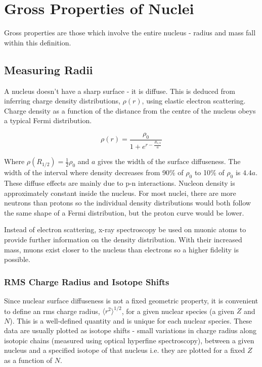 \section{Gross Properties of Nuclei}
Gross properties are those which involve the entire nucleus - radius and mass fall within this definition. 

\subsection{Measuring Radii}
A nucleus doesn't have a sharp surface - it is diffuse. This is deduced from inferring charge density distributions, \(\rho(r)\), using elastic electron scattering. Charge density as a function of the distance from the centre of the nucleus obeys a typical Fermi distribution.

\[\rho (r) = \frac{\rho_0}{1+e^{r-\frac{R_{1/2}}{a}}}\]

Where \(\rho (R_{1/2})=\frac{1}{2}\rho_0\) and \(a\) gives the width of the surface diffuseness. The width of the interval where density decreases from 90\% of \(\rho_0\) to 10\% of \(\rho_0\) is \(4.4a\). These diffuse effects are mainly due to p-n interactions. Nucleon density is approximately constant inside the nucleus. For most nuclei, there are more neutrons than protons so the individual density distributions would both follow the same shape of a Fermi distribution, but the proton curve would be lower. 

Instead of electron scattering, x-ray spectroscopy be used on muonic atoms to provide further information on the density distribution. With their increased mass, muons exist closer to the nucleus than electrons so a higher fidelity is possible.

\subsubsection*{RMS Charge Radius and Isotope Shifts}
Since nuclear surface diffuseness is not a fixed geometric property, it is convenient to define an rms charge radius, \(\langle r^2 \rangle ^{1/2}\), for a given nuclear species (a given \(Z\) and \(N\)). This is a well-defined quantity and is unique for each nuclear species. These data are usually plotted as isotope shifts - small variations in charge radius along isotopic chains (measured using optical hyperfine spectroscopy), between a given nucleus and a specified isotope of that nucleus i.e. they are plotted for a fixed \(Z\) as a function of \(N\).

